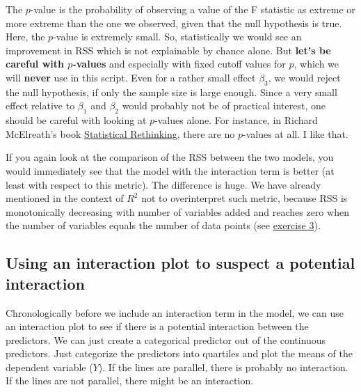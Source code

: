 \documentclass[
]{book}
\begin{document}
The \(p\)-value is the probability of observing a value of the F statistic as extreme or more
extreme than the one we observed, given that the null hypothesis is true. Here,
the \(p\)-value is extremely small. So, statistically we would see an improvement in RSS
which is not explainable by chance alone.
But \textbf{let's be careful with \(p\)-values} and especially with fixed cutoff values for \(p\),
which we will \textbf{never} use in this script.
Even for a rather small effect \(\beta_3\), we would reject the null hypothesis, if only the sample
size is large enough. Since a very small effect relative to \(\beta_1\) and \(\beta_2\) would
probably not be of practical interest, one should be careful with looking at \(p\)-values alone.
For instance, in Richard McElreath's book \href{https://xcelab.net/rm/statistical-rethinking/}{Statistical Rethinking},
there are no \(p\)-values at all. I like that.

If you again look at the comparison of the RSS between the two models, you would
immediately see that the model with the interaction term is better (at least with respect to this metric).
The difference is huge. We have already mentioned in the context of \(R^2\) not to overinterpret
such metric, because RSS is monotonically decreasing with number of variables added and reaches
zero when the number of variables equals the number of data points (see \hyperref[exercise3_multiple_regression]{exercise 3}).

\subsection{Using an interaction plot to suspect a potential interaction}\label{interaction_plot}

Chronologically before we include an interaction term in the model, we can use an interaction plot
to see if there is a potential interaction between the predictors.
We can just create a categorical predictor out of the continuous predictors.
Just categorize the predictors into quartiles and plot the means of the dependent variable (\(Y\)).
If the lines are parallel, there is probably no interaction. If the lines are not parallel,
there might be an interaction.
\end{document}
